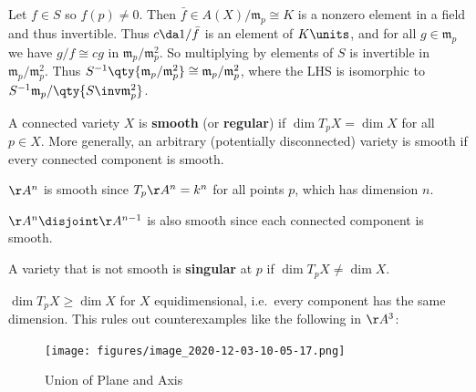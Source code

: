 Let \(f\in S\) so \(f(p) \neq 0\). Then
\(\bar f\in A(X) / \mathfrak{m}_p \cong K\) is a nonzero element in a
field and thus invertible. Thus \(c\da 1/\bar f\) is an element of
\(K\units\), and for all \(g\in \mathfrak{m}_p\) we have
\(g/f \cong cg\) in \(\mathfrak{m}_p / \mathfrak{m}_p^2\). So
multiplying by elements of \(S\) is invertible in
\(\mathfrak{m}_p / \mathfrak{m}_p^2\). Thus
\(S^{-1} \qty{\mathfrak{m}_p / \mathfrak{m}_p^2} \cong \mathfrak{m}_p / \mathfrak{m}_p^2\),
where the LHS is isomorphic to
\(S^{-1} \mathfrak{m}_p / \qty{S\inv \mathfrak{m}_p^2}\).

\begin{definition}

A connected variety \(X\) is \textbf{smooth} (or \textbf{regular}) if
\(\dim T_p X = \dim X\) for all \(p\in X\). More generally, an arbitrary
(potentially disconnected) variety is smooth if every connected
component is smooth.

\end{definition}

\begin{example}[?]

\(\AA^n\) is smooth since \(T_p \AA^n = k^n\) for all points \(p\),
which has dimension \(n\).

\end{example}

\begin{example}[?]

\(\AA^n \disjoint \AA^{n-1}\) is also smooth since each connected
component is smooth.

\end{example}

\begin{definition}

A variety that is not smooth is \textbf{singular} at \(p\) if
\(\dim T_p X \neq \dim X\).

\end{definition}

\begin{fact}

\(\dim T_p X\geq \dim X\) for \(X\) equidimensional, i.e.~every
component has the same dimension. This rules out counterexamples like
the following in \(\AA^3\):

\begin{figure}
\centering
\texttt{[image: figures/image\_2020-12-03-10-05-17.png]}
\caption{Union of Plane and Axis}
\end{figure}

\end{fact}

